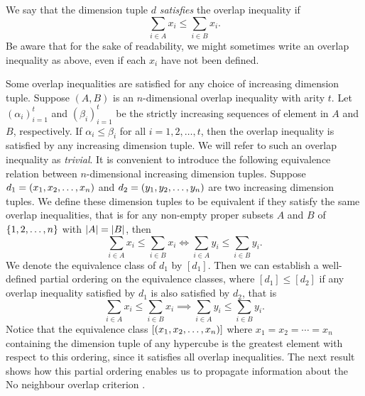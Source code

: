 
\noindent We say that the dimension tuple $d$ \textit{satisfies} the overlap inequality if
\[
\sum_{i \in A} x_i \leq \sum_{i \in B} x_i.
\]
Be aware that for the sake of readability, we might sometimes write an overlap inequality as above, even if each $x_i$ have not been defined.

Some overlap inequalities are satisfied for any choice of increasing dimension tuple. Suppose $(A, B)$ is an $n$-dimensional overlap inequality with arity $t$. Let $(\alpha_i)_{i=1}^t$ and $(\beta_i)_{i=1}^t$ be the strictly increasing sequences of element in $A$ and $B$, respectively. If $\alpha_i \leq \beta_i$ for all $i = 1, 2, \dotsc, t$, then the overlap inequality is satisfied by any increasing dimension tuple. We will refer to such an overlap inequality as \textit{trivial}. It is convenient to introduce the following equivalence relation between $n$-dimensional increasing dimension tuples. Suppose $d_1 = \left( x_1, x_2, \dotsc, x_n \right)$ and $d_2 = \left( y_1, y_2, \dotsc, y_n \right)$ are two increasing dimension tuples. We define these dimension tuples to be equivalent if they satisfy the same overlap inequalities, that is for any non-empty proper subsets $A$ and $B$ of $\left\{ 1, 2, \dotsc, n \right\}$ with $\lvert A\rvert = \lvert B\rvert$, then
\[
\sum_{i \in A} x_i \leq \sum_{i \in B} x_i
\iff
\sum_{i \in A} y_i \leq \sum_{i \in B} y_i.
\]
We denote the equivalence class of $d_1$ by $[d_1]$. Then we can establish a well-defined partial ordering on the equivalence classes, where $[d_1] \leq [d_2]$ if any overlap inequality satisfied by $d_1$ is also satisfied by $d_2$, that is
\[
\sum_{i \in A} x_i \leq \sum_{i \in B} x_i
\implies
\sum_{i \in A} y_i \leq \sum_{i \in B} y_i.
\]
Notice that the equivalence class $[\left( x_1, x_2, \dotsc, x_n \right)]$ where $x_1 = x_2 = \dotsb = x_n$ containing the dimension tuple of any hypercube is the greatest element with respect to this ordering, since it satisfies all overlap inequalities. The next result shows how this partial ordering enables us to propagate information about the No neighbour overlap criterion .

